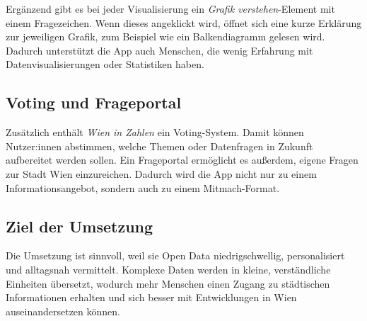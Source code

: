 Ergänzend gibt es bei jeder Visualisierung ein \textit{Grafik verstehen}-Element mit einem Fragezeichen. Wenn dieses angeklickt wird, öffnet sich eine kurze Erklärung zur jeweiligen Grafik, zum Beispiel wie ein Balkendiagramm gelesen wird. Dadurch unterstützt die App auch Menschen, die wenig Erfahrung mit Datenvisualisierungen oder Statistiken haben.

\subsection{Voting und Frageportal}

Zusätzlich enthält \textit{Wien in Zahlen} ein Voting-System. Damit können Nutzer:innen abstimmen, welche Themen oder Datenfragen in Zukunft aufbereitet werden sollen. Ein Frageportal ermöglicht es außerdem, eigene Fragen zur Stadt Wien einzureichen. Dadurch wird die App nicht nur zu einem Informationsangebot, sondern auch zu einem Mitmach-Format.

\subsection{Ziel der Umsetzung}

Die Umsetzung ist sinnvoll, weil sie Open Data niedrigschwellig, personalisiert und alltagsnah vermittelt. Komplexe Daten werden in kleine, verständliche Einheiten übersetzt, wodurch mehr Menschen einen Zugang zu städtischen Informationen erhalten und sich besser mit Entwicklungen in Wien auseinandersetzen können.